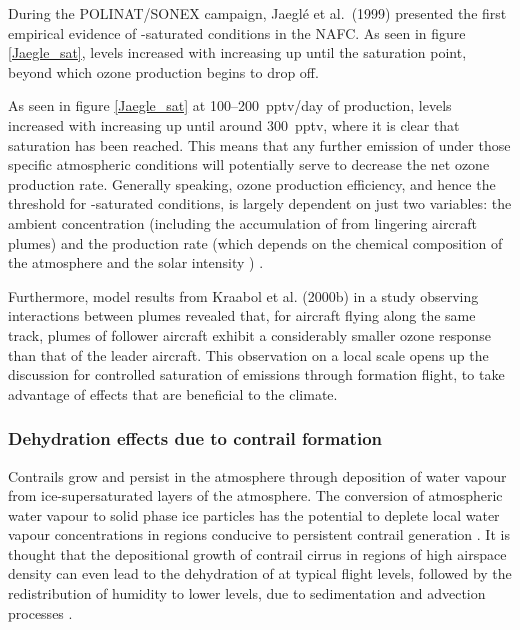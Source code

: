 During the POLINAT/SONEX campaign, Jaegl\'{e} et al.\ (1999) \cite{Jaegle1999} presented the first empirical evidence of -saturated conditions in the NAFC. As seen in figure \ref{Jaegle_sat},  levels increased with increasing  up until the saturation point, beyond which ozone production begins to drop off. 

As seen in figure \ref{Jaegle_sat} at 100--200~pptv/day of  production,  levels increased with increasing  up until around 300~pptv, where it is clear that  saturation has been reached. This means that any further emission of  under those specific atmospheric conditions will potentially serve to decrease the net ozone production rate. Generally speaking, ozone production efficiency, and hence the threshold for -saturated conditions, is largely dependent on just two variables: the ambient  concentration (including the accumulation of  from lingering aircraft plumes) and the  production rate (which depends on the chemical composition of the atmosphere and the solar intensity \cite{Monks2005}) \cite{Jaegle2001}. 

Furthermore, model results from Kraabol et al. (2000b) \cite{Kraabol2000b} in a study observing interactions between plumes revealed that, for aircraft flying along the same track, plumes of follower aircraft exhibit a considerably smaller ozone response than that of the leader aircraft. This observation on a local scale opens up the discussion for controlled saturation of emissions through formation flight, to take advantage of effects that are beneficial to the climate.

\subsubsection{Dehydration effects due to contrail formation}
Contrails grow and persist in the atmosphere through deposition of water vapour from ice-supersaturated layers of the atmosphere. The conversion of atmospheric water vapour to solid phase ice particles has the potential to deplete local water vapour concentrations in regions conducive to persistent contrail generation \cite{Unterstrasser2010}. It is thought that the depositional growth of contrail cirrus in regions of high airspace density can even lead to the dehydration of  at typical flight levels, followed by the redistribution of humidity to lower levels, due to sedimentation and advection processes \cite{Schumann2015}. 

